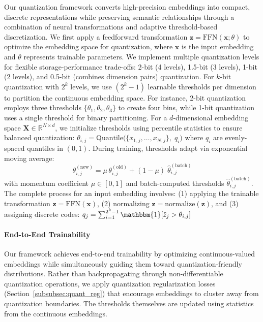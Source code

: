 Our quantization framework converts high-precision embeddings into compact, discrete representations while preserving semantic relationships through a combination of neural transformations and adaptive threshold-based discretization. We first apply a feedforward transformation $\mathbf{z} = \text{FFN}(\mathbf{x}; \theta)$ to optimize the embedding space for quantization, where $\mathbf{x}$ is the input embedding and $\theta$ represents trainable parameters.
We implement multiple quantization levels for flexible storage-performance trade-offs: 2-bit (4 levels), 1.5-bit (3 levels), 1-bit (2 levels), and 0.5-bit (combines dimension pairs) quantization. For $k$-bit quantization with $2^k$ levels, we use $(2^k - 1)$ learnable thresholds per dimension to partition the continuous embedding space. For instance, 2-bit quantization employs three thresholds $\{\theta_1, \theta_2, \theta_3\}$ to create four bins, while 1-bit quantization uses a single threshold for binary partitioning.
For a $d$-dimensional embedding space $\mathbf{X} \in \mathbb{R}^{N \times d}$, we initialize thresholds using percentile statistics to ensure balanced quantization: $\theta_{i,j} = \text{Quantile}\bigl(\{x_{1,j}, \ldots, x_{N,j}\},\; q_i\bigr)$
where $q_i$ are evenly-spaced quantiles in $(0,1)$. During training, thresholds adapt via exponential moving average: $$\theta_{i,j}^{(\text{new})} = \mu\,\theta_{i,j}^{(\text{old})} + (1-\mu)\;\widehat{\theta}_{i,j}^{(\text{batch})}$$
with momentum coefficient $\mu \in [0,1]$ and batch-computed thresholds $\widehat{\theta}_{i,j}^{(\text{batch})}$.
The complete process for an input embedding involves: (1) applying the trainable transformation $\mathbf{z} = \text{FFN}(\mathbf{x})$, (2) normalizing $\hat{\mathbf{z}} = \text{normalize}(\mathbf{z})$, and (3) assigning discrete codes: $q_j = \sum_{i=1}^{2^k-1} \mathbbm{1}[\hat{z}_j > \theta_{i,j}]$

\paragraph{End-to-End Trainability}
Our framework achieves end-to-end trainability by optimizing continuous-valued embeddings while simultaneously guiding them toward quantization-friendly distributions. 
Rather than backpropagating through non-differentiable quantization operations, we apply quantization regularization losses (Section~\ref{subsubsec:quant_reg}) that encourage embeddings to cluster away from quantization boundaries. 
The thresholds themselves are updated using statistics from the continuous embeddings.%



